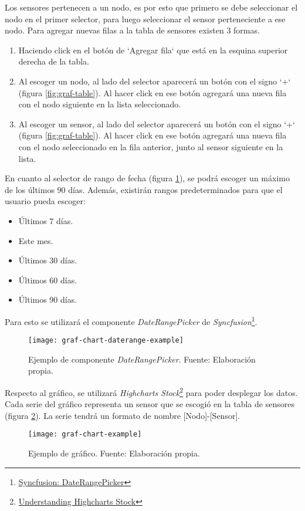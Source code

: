 Los sensores pertenecen a un nodo, es por esto que primero se debe seleccionar el nodo en el primer selector, para luego seleccionar el sensor perteneciente a ese nodo.
Para agregar nuevas filas a la tabla de sensores existen 3 formas.
\begin{enumerate}
    \item Haciendo click en el botón de `Agregar fila` que está en la esquina superior derecha de la tabla.
    \item Al escoger un nodo, al lado del selector aparecerá un botón con el signo `+` (figura \ref{fig:graf-table}). Al hacer click en ese botón agregará una nueva fila con el nodo siguiente en la lista seleccionado.
    \item Al escoger un sensor, al lado del selector aparecerá un botón con el signo `+` (figura \ref{fig:graf-table}). Al hacer click en ese botón agregará una nueva fila con el nodo seleccionado en la fila anterior, junto al sensor siguiente en la lista.
\end{enumerate}

En cuanto al selector de rango de fecha (figura \ref{fig:graf-chart-daterange-example}), se podrá escoger un máximo de los últimos 90 días. Además, existirán rangos predeterminados para que el usuario pueda escoger:
\begin{itemize}
    \item Últimos 7 días.
    \item Este mes.
    \item Últimos 30 días.
    \item Últimos 60 días.
    \item Últimos 90 días.
\end{itemize}
Para esto se utilizará el componente \textit{DateRangePicker} de \textit{Syncfusion}\footnote{\href{https://ej2.syncfusion.com/react/documentation/daterangepicker/getting-started}{Syncfusion: DateRangePicker}}.
\begin{figure}[H]
	\centering
	\texttt{[image: graf-chart-daterange-example]}
	\caption{\label{fig:graf-chart-daterange-example} Ejemplo de componente \textit{DateRangePicker}. Fuente: Elaboración propia.}
\end{figure}
Respecto al gráfico, se utilizará \textit{Highcharts Stock}\footnote{\href{https://www.highcharts.com/docs/stock/understanding-highcharts-stock}{Understanding Highcharts Stock}} para poder desplegar los datos. Cada serie del gráfico representa un sensor que se escogió en la tabla de sensores (figura \ref{fig:graf-chart-example}). La serie tendrá un formato de nombre [Nodo]-[Sensor].
\begin{figure}[H]
	\centering
	\texttt{[image: graf-chart-example]}
	\caption{\label{fig:graf-chart-example} Ejemplo de gráfico. Fuente: Elaboración propia.}
\end{figure}

